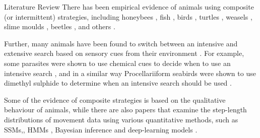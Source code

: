 \begin{section}{Literature Review \label{sec:litreview}}
There has been empirical evidence of animals using composite (or intermittent) strategies, including honeybees \cite{Tyson_2011}, fish \cite{Hills_2002}, birds \cite{Nolet_2002}, turtles \cite{Tyson_2011}, weasels \cite{Haskell_1997}, slime moulds \cite{Latty_2009}, beetles \cite{Ferran_1994}, and others \cite{Benhamou_1994,Reynolds_2009_adaptive,Morales_2004,Klaassen_2006,Jonsen_2007}.

Further, many animals have been found to switch between an intensive and extensive search based on sensory cues from their environment \cite{Sugimoto_1987,Bell_1990,Strand_1982,Persons_1997,Nevitt_2000,Leick_1985,Hellung-Larsen_1990,Dusenbery_1998,Moore_2004,Doving_1994,Dalby-Ball_2000}.
For example, some parasites were shown to use chemical cues to decide when to use an intensive search \cite{Sugimoto_1987,Bell_1990,Strand_1982}, and in a similar way Procellariiform seabirds were shown to use dimethyl sulphide to determine when an intensive search should be used \cite{Nevitt_2000}.

Some of the evidence of composite strategies is based on the qualitative behaviour of animals, while there are also papers that examine the step-length distributions of movement data using various quantitative methods, such as \acp{SSM},\cite{Jonsen_2007}, \acp{HMM} \cite{Joo_2013,Patterson_2017}, Bayesian inference \cite{Parton_2017} and deep-learning models \cite{Browning_2017}.

\iffalse
B\'{e}nichou \etal \cite{Benichou_2011} provided a thorough review of intermittent search strategies, on both the microscopic and macroscopic scale.
They considered intermittent strategies as a slow search phase with possible detection of food, followed by a fast movement phase with no possibility of food detection.
\fi
\end{section}
